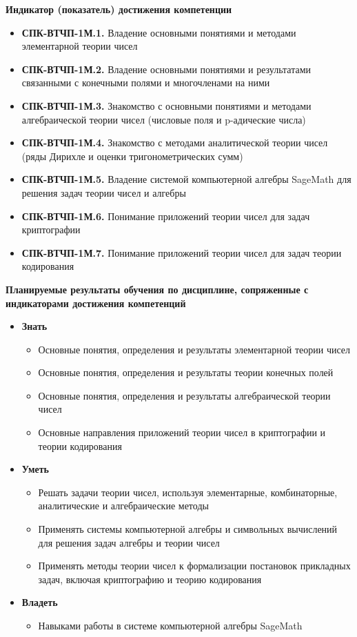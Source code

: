 \documentclass[a4paper, 12pt]{article}
\begin{document}
{\bf Индикатор (показатель) достижения компетенции}
\begin{itemize}[noitemsep,topsep=0pt]
    \item {\bf СПК-ВТЧП-1М.1.} Владение основными понятиями и методами элементарной теории чисел
    \item {\bf СПК-ВТЧП-1М.2.} Владение основными понятиями и результатами связанными с конечными полями и многочленами на ними
    \item {\bf СПК-ВТЧП-1М.3.} Знакомство с основными понятиями и методами алгебраической теории чисел (числовые поля и p-адические числа)
    \item {\bf СПК-ВТЧП-1М.4.} Знакомство с методами аналитической теории чисел (ряды Дирихле и оценки тригонометрических сумм)
    \item {\bf СПК-ВТЧП-1М.5.} Владение системой компьютерной алгебры SageMath для решения задач теории чисел и алгебры
    \item {\bf СПК-ВТЧП-1М.6.} Понимание приложений теории чисел для задач криптографии
    \item {\bf СПК-ВТЧП-1М.7.} Понимание приложений теории чисел для задач теории кодирования
\end{itemize}

{\bf Планируемые результаты обучения по 
дисциплине, сопряженные с индикаторами   
достижения компетенций}
\begin{itemize}[noitemsep,topsep=0pt]
    \item {\bf Знать}
    \begin{itemize}[noitemsep,topsep=0pt]
        \item Основные понятия, определения и результаты элементарной теории чисел
        \item Основные понятия, определения и результаты теории конечных полей
        \item Основные понятия, определения и результаты алгебраической теории чисел
        \item Основные направления приложений теории чисел в криптографии и теории кодирования
    \end{itemize}
    \item {\bf Уметь}
    \begin{itemize}[noitemsep,topsep=0pt]
        \item Решать задачи теории чисел, используя элементарные, комбинаторные,  аналитические и алгебраические методы
        \item Применять системы компьютерной алгебры и символьных вычислений для решения задач алгебры и теории чисел
        \item Применять методы теории чисел к формализации постановок прикладных задач, включая криптографию и теорию кодирования
    \end{itemize}
    \item {\bf Владеть}
    \begin{itemize}[noitemsep,topsep=0pt]
        \item Навыками работы в системе компьютерной алгебры SageMath
    \end{itemize}
\end{itemize}
\end{document}
